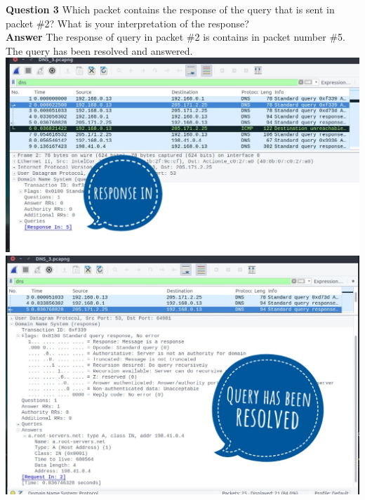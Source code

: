 \documentclass[14pt]{extarticle}
\begin{document}
    \noindent
    \textbf{\large Question 3}
    Which packet contains the response of the query that is sent in packet \#2? What is your interpretation
of the response?\\[10pt]
    \textbf{\large Answer}
    The response of query in packet \#2 is contains in packet number \#5. The query has been resolved and answered.\\[10pt]
    \includegraphics[scale=0.45]{3_3_1}\\[10pt]
    \includegraphics[scale=0.45]{3_3_2}\\[10pt]
    \vspace{1cm}
\end{document}

